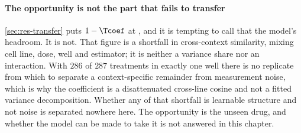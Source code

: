 \paragraph{The opportunity is not the part that fails to transfer}
\cref{sec:res-transfer} puts $1 - \Tcoef$ at , and it
is tempting to call that the model's headroom. It is not. That figure is a
shortfall in cross-context similarity, mixing cell line, dose, well and
estimator; it is neither a variance share nor an interaction. With $286$ of $287$
treatments in exactly one well there is no replicate from which to separate a
context-specific remainder from measurement noise, which is why the coefficient
is a disattenuated cross-line cosine and not a fitted variance
decomposition. Whether any of that shortfall is learnable structure and not noise is
separated nowhere here. The opportunity is the unseen drug, and whether the model
can be made to take it is not answered in this chapter.

